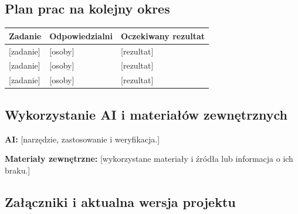 \documentclass[11pt,a4paper,oneside]{article}
\newif\ifpodpowiedzi
\newcommand{\podpowiedz}[1]{\ifpodpowiedzi\par\begingroup\small\color{hintcolor}\textit{Wskazówka: #1}\par\endgroup\fi}
\newcommand{\pole}[1]{\textnormal{[#1]}}
\begin{document}
\subsection{Plan prac na kolejny okres}
\podpowiedz{Wymień zadania do kolejnego spotkania, osoby odpowiedzialne oraz oczekiwane rezultaty. Uwzględnij zadania niezakończone i zależności między pracami.}
\begin{tabularx}{\textwidth}{@{}Y p{0.25\textwidth} Y@{}}
\toprule
Zadanie & Odpowiedzialni & Oczekiwany rezultat\\
\midrule
\pole{zadanie} & \pole{osoby} & \pole{rezultat}\\
\pole{zadanie} & \pole{osoby} & \pole{rezultat}\\
\pole{zadanie} & \pole{osoby} & \pole{rezultat}\\
\bottomrule
\end{tabularx}

\subsection{Wykorzystanie AI i materiałów zewnętrznych}
\podpowiedz{Jeżeli AI miała istotny wpływ na prace z tego okresu, wskaż narzędzie, zadania, zakres zastosowania oraz sposób weryfikacji wyników. Rozróżnij wsparcie prac od rozwijania funkcji AI będących częścią projektu. Nie dołączaj pełnej historii rozmów ani wszystkich promptów. Możesz odwołać się do opisów zadań zamiast powtarzać informacje. Gdy nie korzystano z AI, wpisz tę informację.}
\textbf{AI:} \pole{narzędzie, zastosowanie i weryfikacja.}\par
\podpowiedz{Wskaż nowe źródła, biblioteki, modele, dane, zasoby lub cudze fragmenty kodu wykorzystane w tym okresie oraz ich pochodzenie i warunki wykorzystania. W razie potrzeby dodaj wykaz źródeł z odnośnikami.}
\textbf{Materiały zewnętrzne:} \pole{wykorzystane materiały i źródła lub informacja o ich braku.}

\subsection{Załączniki i aktualna wersja projektu}

\podpowiedz{Podaj adres repozytorium lub uzgodnionego z prowadzącymi miejsca przechowywania materiałów. W polu „Wersja na koniec okresu” wskaż stan projektu opisany w raporcie: identyfikator commitu, tag albo nazwę i datę wersji plików, np. animacja-v03-2026-10-25. Nie chodzi tu o wersję dokumentu raportu. W tabeli wymień materiały potwierdzające wykonane prace, np. wyniki testów, zrzuty ekranu, pliki projektu lub próbne rendery. W kolumnie „Oznaczenie” nadaj im kolejne symbole Z1, Z2 itd.; w kolumnie „Plik / odnośnik” podaj nazwę pliku lub adres umożliwiający dostęp; w kolumnie „Opis i powiązane zadanie” wyjaśnij, co materiał przedstawia i którego zadania dotyczy, np. „Wyniki testów logowania opisanych w pkt 1.3.1”. Do oznaczeń załączników odwołuj się w opisach wykonanych prac. Dodaj lub usuń wiersze według potrzeb. Sam odnośnik do materiałów nie zastępuje opisu prac w raporcie.}
\end{document}
